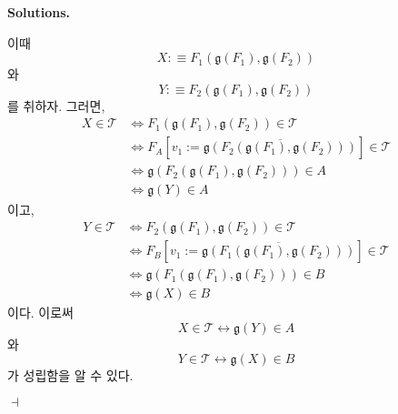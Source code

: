 \documentclass[12pt]{paper}
\newcommand{\gnum}{ \mathfrak{g} }
\newenvironment{context}[1][]{\noindent \textbf{{#1}.}}{\hfill $ \dashv $}
\begin{document}
\begin{context}[Solutions]
\begin{enumerate}
      이때 $$X : \equiv F_1 \left( \gnum \left( F_1 \right) , \gnum \left( F_2 \right) \right)$$와 $$Y : \equiv F_2 \left( \gnum \left( F_1 \right) , \gnum \left( F_2 \right) \right)$$를 취하자.
      그러면,
      \begin{align*}
        X \in \mathcal{T}
        & \iff F_1 \left( \gnum \left( F_1 \right) , \gnum \left( F_2 \right) \right) \in \mathcal{T} \\
        & \iff F_A \left[ v_1 := \overline{\gnum \left( F_2 \left( \gnum \left( F_1 \right) , \gnum \left( F_2 \right) \right) \right)} \right] \in \mathcal{T} \\
        & \iff \gnum \left( F_2 \left( \gnum \left( F_1 \right) , \gnum \left( F_2 \right) \right) \right) \in A \\
        & \iff \gnum \left( Y \right) \in A
      \end{align*}
      이고,
      \begin{align*}
        Y \in \mathcal{T}
        & \iff F_2 \left( \gnum \left( F_1 \right) , \gnum \left( F_2 \right) \right) \in \mathcal{T} \\
        & \iff F_B \left[ v_1 := \overline{\gnum \left( F_1 \left( \gnum \left( F_1 \right) , \gnum \left( F_2 \right) \right) \right)} \right] \in \mathcal{T} \\
        & \iff \gnum \left( F_1 \left( \gnum \left( F_1 \right) , \gnum \left( F_2 \right) \right) \right) \in B \\
        & \iff \gnum \left( X \right) \in B
      \end{align*}
      이다.
      이로써 $$X \in \mathcal{T} \leftrightarrow \gnum \left( Y \right) \in A$$와 $$Y \in \mathcal{T} \leftrightarrow \gnum \left( X \right) \in B$$가 성립함을 알 수 있다.
    \end{enumerate}
  \end{context}
\end{document}
